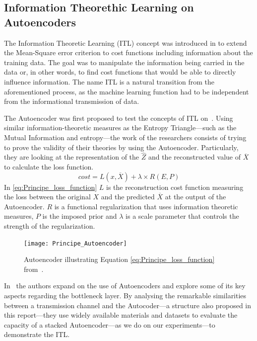 \subsection{Information Theorethic Learning on Autoencoders}

The Information Theoretic Learning (ITL) concept was introduced in \cite{Principe_2000} to extend the Mean-Square error criterion to cost functions including information about the training data. The goal was to manipulate the information being carried in the data or, in other words, to find cost functions that would be able to directly influence information. The name ITL is a natural transition from the aforementioned process, as the machine learning function had to be independent from the informational transmission of data. 


The Autoencoder was first proposed to test the concepts of ITL on~\cite{Santana_2016}. Using similar information-theoretic measures as the Entropy Triangle---such as the Mutual Information and entropy---the work of the researchers consists of trying to prove the validity of their theories by using the Autoencoder. Particularly, they are looking at the representation of the $\hat{Z}$ and the reconstructed value of $\overline{X}$ to calculate the loss function.
\begin{equation}
\label{eq:Principe_loss_function}
cost = L(x,\overline{X}) + \lambda \times R(E,P)
\end{equation}
In \eqref{eq:Principe_loss_function} $L$ is the reconstruction cost function measuring the loss between the original $X$ and the predicted $\overline{X}$ at the output of the Autoencoder. $R$ is a functional regularization that uses information theoretic measures, $P$ is the imposed prior and $\lambda$ is a scale parameter that controls the strength of the regularization.

\begin{figure}[H]
	\centering	
	\texttt{[image: Principe\_Autoencoder]}
	\caption{Autoencoder illustrating Equation \ref{eq:Principe_loss_function} from~\protect\cite{Santana_2016}.}
	\label{fig:figure_autoencoder2}
\end{figure} 

In~\cite{Yu_2019} the authors expand on the use of Autoencoders and explore some of its key aspects regarding the bottleneck layer. By analysing the remarkable similarities between a transmission channel and the Autocoder---a structure also proposed in this report---they use widely available materials and datasets to evaluate the capacity of a stacked Autoencoder---as we do on our experiments---to demonstrate the ITL. 


